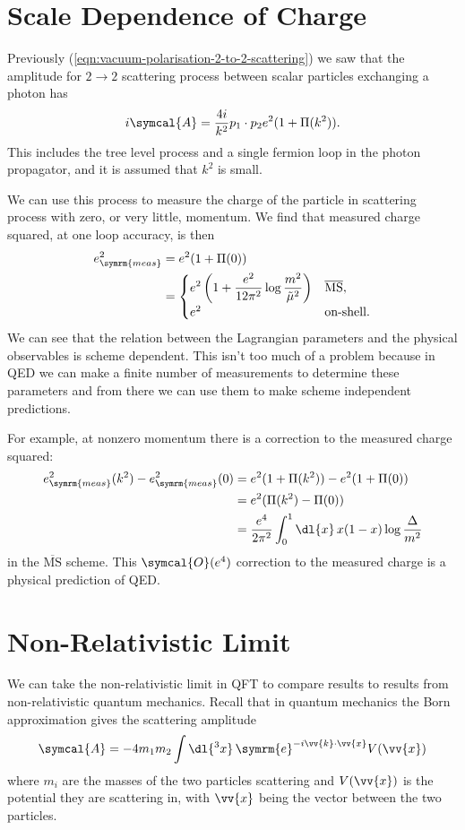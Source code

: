 \documentclass[fleqn]{NotesClass}
\newcommand{\MSbar}{\ensuremath{\overline{\text{MS}}}}
\newcommand{\e}{\symrm{e}}
\newcommand{\amplitude}{\symcal{A}}
\newcommand{\order}{\symcal{O}}
\newcommand{\measured}{\symrm{meas}}
\begin{document}
    \section{Scale Dependence of Charge}
    Previously (\cref{eqn:vacuum-polarisation-2-to-2-scattering}) we saw that the amplitude for \(2 \to 2\) scattering process between scalar particles exchanging a photon has
    \begin{equation}
        i\amplitude = \frac{4i}{k^2} p_1 \cdot p_2 e^2(1 + \Pi(k^2)).
    \end{equation}
    This includes the tree level process and a single fermion loop in the photon propagator, and it is assumed that \(k^2\) is small.
    
    We can use this process to measure the charge of the particle in scattering process with zero, or very little, momentum.
    We find that measured charge squared, at one loop accuracy, is then
    \begin{align}
        e_{\measured}^2 &= e^2(1 + \Pi(0))\\
        &= 
        \begin{cases}
            \displaystyle e^2\left( 1 + \frac{e^2}{12\pi^2} \log \frac{m^2}{\tilde{\mu}^2} \right) & \MSbar,\\
            e^2 & \text{on-shell}.
        \end{cases}
    \end{align}
    We can see that the relation between the Lagrangian parameters and the physical observables is scheme dependent.
    This isn't too much of a problem because in QED we can make a finite number of measurements to determine these parameters and from there we can use them to make scheme independent predictions.
    
    For example, at nonzero momentum there is a correction to the measured charge squared:
    \begin{align}
        e_{\measured}^2(k^2) - e_{\measured}^2(0) &= e^2(1 + \Pi(k^2)) - e^2(1 + \Pi(0))\\
        &= e^2(\Pi(k^2) - \Pi(0))\\
        &= \frac{e^4}{2\pi^2} \int_0^1 \dl{x} \, x(1 - x) \log \frac{\Delta}{m^2}
    \end{align}
    in the \MSbar{} scheme.
    This \(\order(e^4)\) correction to the measured charge is a physical prediction of QED.
    
    \section{Non-Relativistic Limit}
    We can take the non-relativistic limit in QFT to compare results to results from non-relativistic quantum mechanics.
    Recall that in quantum mechanics the Born approximation gives the scattering amplitude
    \begin{equation}
        \amplitude = -4m_1m_2 \int \dl{^3x} \, \e^{-i\vv{k} \cdot \vv{x}} V(\vv{x})
    \end{equation}
    where \(m_i\) are the masses of the two particles scattering and \(V(\vv{x})\) is the potential they are scattering in, with \(\vv{x}\) being the vector between the two particles.
    
\end{document}
